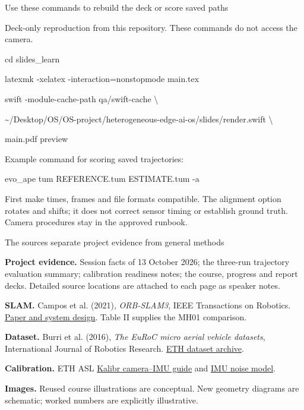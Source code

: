 \documentclass[aspectratio=169,12pt,t]{beamer}
\newcommand{\para}[1]{#1\par\medskip}
\begin{document}
\begin{frame}{Use these commands to rebuild the deck or score saved paths}

\para{Deck-only reproduction from this repository. These commands do not access the camera.}
{\small\ttfamily
cd slides\_learn\par
latexmk -xelatex -interaction=nonstopmode main.tex\par\medskip
swift -module-cache-path qa/swift-cache \textbackslash{}\par
\quad \textasciitilde/Desktop/OS/OS-project/heterogeneous-edge-ai-os/slides/render.swift \textbackslash{}\par
\quad main.pdf preview\par}
\medskip\para{Example command for scoring saved trajectories:}
{\small\ttfamily evo\_ape tum REFERENCE.tum ESTIMATE.tum -a\par}
\medskip\para{First make times, frames and file formats compatible. The alignment option rotates and shifts; it does not correct sensor timing or establish ground truth. Camera procedures stay in the approved runbook.}

\end{frame}

\begin{frame}{The sources separate project evidence from general methods}

{\small
\para{\textbf{Project evidence.} Session facts of 13 October 2026; the three-run trajectory evaluation summary; calibration readiness notes; the course, progress and report decks. Detailed source locations are attached to each page as speaker notes.}
\para{\textbf{SLAM.} Campos et al. (2021), \emph{ORB-SLAM3}, IEEE Transactions on Robotics. \href{https://arxiv.org/abs/2007.11898}{Paper and system design}. Table II supplies the MH01 comparison.}
\para{\textbf{Dataset.} Burri et al. (2016), \emph{The EuRoC micro aerial vehicle datasets}, International Journal of Robotics Research. \href{https://ethz-asl.github.io/datasets/}{ETH dataset archive}.}
\para{\textbf{Calibration.} ETH ASL \href{https://github.com/ethz-asl/kalibr/wiki/camera-imu-calibration}{Kalibr camera--IMU guide} and \href{https://github.com/ethz-asl/kalibr/wiki/IMU-Noise-Model}{IMU noise model}.}
\para{\textbf{Images.} Reused course illustrations are conceptual. New geometry diagrams are schematic; worked numbers are explicitly illustrative.}
}

\end{frame}
\end{document}
